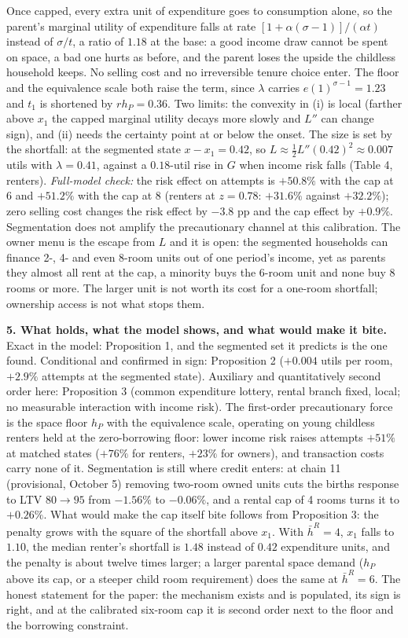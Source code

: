 \documentclass[10pt]{article}
\newcommand{\1}{\mathbf 1}
\newcommand{\hbR}{\bar h^{R}}
\begin{document}
Once capped, every extra unit of expenditure goes to consumption alone, so the parent's marginal utility of expenditure falls at rate $[1+\alpha(\sigma-1)]/(\alpha t)$ instead of $\sigma/t$, a ratio of $1.18$ at the base: a good income draw cannot be spent on space, a bad one hurts as before, and the parent loses the upside the childless household keeps. No selling cost and no irreversible tenure choice enter. The floor and the equivalence scale both raise the term, since $\lambda$ carries $e(1)^{\sigma-1}=1.23$ and $t_1$ is shortened by $rh_P=0.36$. Two limits: the convexity in (i) is local (farther above $x_1$ the capped marginal utility decays more slowly and $L''$ can change sign), and (ii) needs the certainty point at or below the onset. The size is set by the shortfall: at the segmented state $x-x_1=0.42$, so $L\approx\tfrac12L''(0.42)^{2}\approx0.007$ utils with $\lambda=0.41$, against a $0.18$-util rise in $G$ when income risk falls (Table 4, renters). \emph{Full-model check:} the risk effect on attempts is $+50.8\%$ with the cap at 6 and $+51.2\%$ with the cap at 8 (renters at $z=0.78$: $+31.6\%$ against $+32.2\%$); zero selling cost changes the risk effect by $-3.8$ pp and the cap effect by $+0.9\%$. Segmentation does not amplify the precautionary channel at this calibration. The owner menu is the escape from $L$ and it is open: the segmented households can finance 2-, 4- and even 8-room units out of one period's income, yet as parents they almost all rent at the cap, a minority buys the 6-room unit and none buy 8 rooms or more. The larger unit is not worth its cost for a one-room shortfall; ownership access is not what stops them.

\medskip
\textbf{5. What holds, what the model shows, and what would make it bite.}
Exact in the model: Proposition 1, and the segmented set it predicts is the one found. Conditional and confirmed in sign: Proposition 2 ($+0.004$ utils per room, $+2.9\%$ attempts at the segmented state). Auxiliary and quantitatively second order here: Proposition 3 (common expenditure lottery, rental branch fixed, local; no measurable interaction with income risk). The first-order precautionary force is the space floor $h_P$ with the equivalence scale, operating on young childless renters held at the zero-borrowing floor: lower income risk raises attempts $+51\%$ at matched states ($+76\%$ for renters, $+23\%$ for owners), and transaction costs carry none of it. Segmentation is still where credit enters: at chain 11 (provisional, October 5) removing two-room owned units cuts the births response to LTV $80\to95$ from $-1.56\%$ to $-0.06\%$, and a rental cap of 4 rooms turns it to $+0.26\%$. What would make the cap itself bite follows from Proposition 3: the penalty grows with the square of the shortfall above $x_1$. With $\hbR=4$, $x_1$ falls to $1.10$, the median renter's shortfall is $1.48$ instead of $0.42$ expenditure units, and the penalty is about twelve times larger; a larger parental space demand ($h_P$ above its cap, or a steeper child room requirement) does the same at $\hbR=6$. The honest statement for the paper: the mechanism exists and is populated, its sign is right, and at the calibrated six-room cap it is second order next to the floor and the borrowing constraint.
\end{document}
